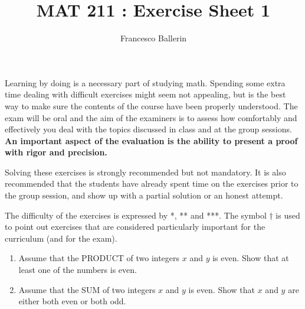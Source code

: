 \documentclass[11pt]{article}%
\title{MAT 211 : Exercise Sheet 1}
\author{Francesco Ballerin}
\date{\color{gray}{\small{francesco.ballerin@uib.no}}}
\begin{document}
\begin{minipage}[t]{\dimexpr \textwidth-6cm-\columnsep}
     \maketitle
\end{minipage}
\hfill\noindent{}

\vspace{50pt}

Learning by doing is a necessary part of studying math. Spending some extra time dealing with difficult exercises might seem not appealing, but is the best way to make sure the contents of the course have been properly understood. The exam will be oral and the aim of the examiners is to assess how comfortably and effectively you deal with the topics discussed in class and at the group sessions. \textbf{An important aspect of the evaluation is the ability to present a proof with rigor and precision.}
\bigskip

Solving these exercises is strongly recommended but not mandatory. It is also recommended that the students have already spent time on the exercises prior to the group session, and show up with a partial solution or an honest attempt.
\bigskip

The difficulty of the exercises is expressed by *, ** and ***. The symbol $\dagger$ is used to point out exercises that are considered particularly important for the curriculum (and for the exam).

\begin{Exercise}[title=*]
	\begin{enumerate}[label={\alph*)}]
		\item Assume that the PRODUCT of two integers $x$ and $y$ is even. Show that at least one of the numbers is even.
		\item Assume that the SUM of two integers $x$ and $y$ is even. Show that $x$ and $y$ are either both even or both odd.
	\end{enumerate}
	
\end{Exercise}	
\end{document}
